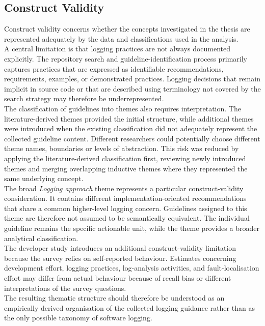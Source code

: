 \subsection{Construct Validity}

Construct validity concerns whether the concepts investigated in the thesis are
represented adequately by the data and classifications used in the analysis.
\\
A central limitation is that logging practices are not always documented explicitly.
The repository search and guideline-identification process primarily captures
practices that are expressed as identifiable recommendations, requirements, examples,
or demonstrated practices. Logging decisions that remain implicit in source code or
that are described using terminology not covered by the search strategy may therefore
be underrepresented.
\\
The classification of guidelines into themes also requires interpretation. The
literature-derived themes provided the initial structure, while additional themes
were introduced when the existing classification did not adequately represent the
collected guideline content. Different researchers could potentially choose different
theme names, boundaries or levels of abstraction. This risk was reduced by applying
the literature-derived classification first, reviewing newly introduced themes and
merging overlapping inductive themes where they represented the same underlying
concept.
\\
The broad \textit{Logging approach} theme represents a particular construct-validity
consideration. It contains different implementation-oriented recommendations that
share a common higher-level logging concern. Guidelines assigned to this theme are
therefore not assumed to be semantically equivalent. The individual guideline remains
the specific actionable unit, while the theme provides a broader analytical
classification.
\\
The developer study introduces an additional construct-validity limitation because
the survey relies on self-reported behaviour. Estimates concerning development
effort, logging practices, log-analysis activities, and fault-localisation effort may
differ from actual behaviour because of recall bias or different interpretations of
the survey questions.
\\
The resulting thematic structure should therefore be understood as an empirically
derived organisation of the collected logging guidance rather than as the only
possible taxonomy of software logging.

